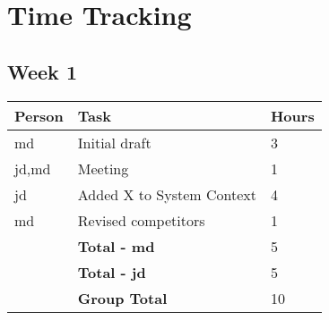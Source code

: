 \chapter{Time Tracking}

\section{Week 1}

\begin{table}[ht]
    \centering
    \begin{tabular}{lp{8cm}l}
    \toprule
    \textbf{Person} & \textbf{Task} & \textbf{Hours} \\
    \midrule
    md    & Initial draft             & 3 \\
    jd,md & Meeting                   & 1 \\
    jd    & Added X to System Context & 4 \\
    md    & Revised competitors       & 1 \\
    \midrule
    & \textbf{Total - md}  & 5 \\
    & \textbf{Total - jd}  & 5 \\
    & \textbf{Group Total} & 10 \\
    \bottomrule
    \end{tabular}
\end{table}

